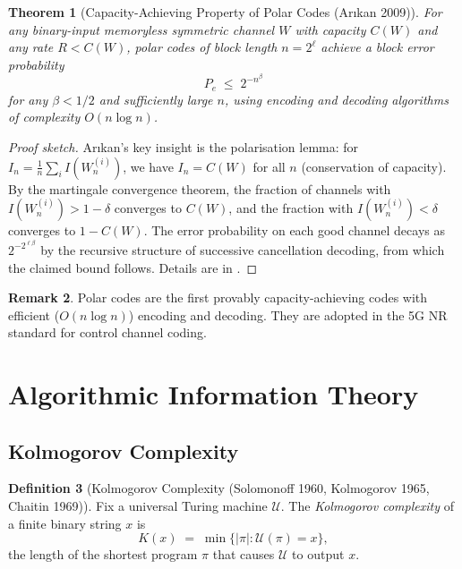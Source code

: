 \documentclass[12pt,a4paper]{amsart}
\newtheorem{theorem}{Theorem}[section]
\theoremstyle{definition}
\newtheorem{definition}[theorem]{Definition}
\newtheorem{remark}[theorem]{Remark}
\theoremstyle{remark}
\begin{document}
\begin{theorem}[Capacity-Achieving Property of Polar Codes (Ar\i{}kan 2009)]
\label{thm:polar}
For any binary-input memoryless symmetric channel $W$ with capacity $C(W)$ and
any rate $R < C(W)$, polar codes of block length $n = 2^\ell$ achieve a block
error probability
\[
  P_e \;\leq\; 2^{-n^\beta}
\]
for any $\beta < 1/2$ and sufficiently large $n$, using encoding and decoding
algorithms of complexity $O(n \log n)$.
\end{theorem}
\begin{proof}[Proof sketch]
Ar\i{}kan's key insight is the polarisation lemma: for $I_n = \frac{1}{n}\sum_i
I(W_n^{(i)})$, we have $I_n = C(W)$ for all $n$ (conservation of capacity). By
the martingale convergence theorem, the fraction of channels with $I(W_n^{(i)}) >
1-\delta$ converges to $C(W)$, and the fraction with $I(W_n^{(i)}) < \delta$
converges to $1-C(W)$. The error probability on each good channel decays as
$2^{-2^{\ell\beta}}$ by the recursive structure of successive cancellation decoding,
from which the claimed bound follows. Details are in \cite{Arikan2009}.
\end{proof}

\begin{remark}
Polar codes are the first provably capacity-achieving codes with efficient
($O(n\log n)$) encoding and decoding. They are adopted in the 5G NR standard
for control channel coding.
\end{remark}

\section{Algorithmic Information Theory}

\subsection{Kolmogorov Complexity}

\begin{definition}[Kolmogorov Complexity (Solomonoff 1960, Kolmogorov 1965, Chaitin 1969)]
Fix a universal Turing machine $\mathcal{U}$. The \emph{Kolmogorov complexity}
of a finite binary string $x$ is
\[
  K(x) \;=\; \min\bigl\{|\pi| : \mathcal{U}(\pi) = x\bigr\},
\]
the length of the shortest program $\pi$ that causes $\mathcal{U}$ to output $x$.
\end{definition}
\end{document}
